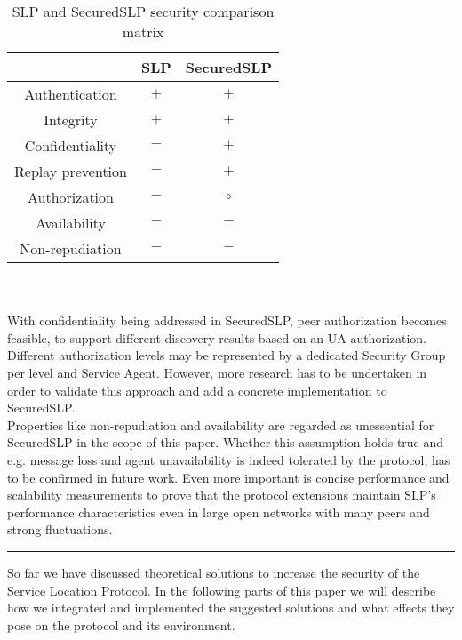 \begin{table}[!h]
\begin{centering}
\begin{tabular}{|c|c|c|}
\hline 
 & SLP & SecuredSLP
\tabularnewline
\hline
\hline 
Authentication & $+$ & $+$
\tabularnewline
\hline 
Integrity & $+$ & $+$
\tabularnewline
\hline 
Confidentiality & $-$ & $+$
\tabularnewline
\hline 
Replay prevention & $-$ & $+$
\tabularnewline
\hline 
Authorization & $-$ & $\circ$
\tabularnewline
\hline 
Availability & $-$ & $-$
\tabularnewline
\hline 
Non-repudiation & $-$ & $-$
\tabularnewline
\hline
\end{tabular}
\par\end{centering}

\caption{\label{tab:SLP-and-SecuredSLP}SLP and SecuredSLP security comparison matrix}
\end{table}\\\\
With confidentiality being addressed in SecuredSLP, peer authorization becomes feasible, to support different discovery results based on an UA authorization. Different authorization levels may be represented by a dedicated Security Group per level and Service Agent. However, more research has to be undertaken in order to validate this approach and add a concrete implementation to SecuredSLP.\\
Properties like non-repudiation and availability are regarded as unessential for SecuredSLP in the scope of this paper. Whether this assumption holds true and e.g. message loss and agent unavailability is indeed tolerated by the protocol, has to be confirmed in future work. Even more important is concise performance and scalability measurements to prove that the protocol extensions maintain SLP's performance characteristics even in large open networks with many peers and strong fluctuations.\\
\hrule
So far we have discussed theoretical solutions to increase the security of the
Service Location Protocol. In the following parts of this paper we will
describe how we integrated and implemented the suggested solutions and what
effects they pose on the protocol and its environment.
